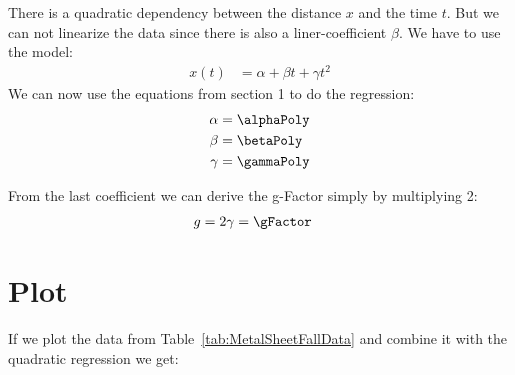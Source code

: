 \documentclass[11pt]{article}
\begin{document}
    
    \pagebreak
    
    
    There is a quadratic dependency between the distance $x$ and the time $t$.
    But we can not linearize the data since there is also a liner-coefficient $\beta$.
    We have to use the model:
    \begin{align*}
        x(t) &= \alpha + \beta t + \gamma t^2
    \end{align*}
    We can now use the equations from section 1 to do the regression:
    \begin{align*}
        \alpha &= \alphaPoly \\
        \beta &= \betaPoly \\
        \gamma &= \gammaPoly
    \end{align*}
    
    From the last coefficient we can derive the g-Factor simply by multiplying 2:
    \begin{align*}
        g &= 2 \gamma = \gFactor
    \end{align*}
    
    \section{Plot}
    If we plot the data from Table~\ref{tab:MetalSheetFallData} and combine it with the quadratic regression we get:
    
    
\end{document}
